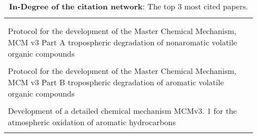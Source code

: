 \begin{table}[H]
    \centering
     \begin{tabular}{p{}r}
     \toprule
      & \\ \\
     Protocol for the development of the Master Chemical Mechanism, MCM v3 Part A tropospheric degradation of nonaromatic volatile organic compounds & \cite{mcmpartA}   \\ \\
        Protocol for the development of the Master Chemical Mechanism, MCM v3 Part B tropospheric degradation of aromatic volatile organic compounds & \cite{mcmpartB}   \\ \\
        Development of a detailed chemical mechanism MCMv3. 1 for the atmospheric oxidation of aromatic hydrocarbons & \cite{detailedmcm}   \\ \\
        \bottomrule
    \end{tabular}
    \caption{\textbf{In-Degree of the citation network}: The top 3 most cited papers.}
    \label{tab:In-Degree_Citation}
    \end{table}

    